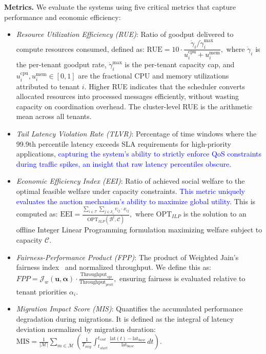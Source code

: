 \documentclass[lettersize,journal]{IEEEtran}
\begin{document}
\textbf{Metrics.} We evaluate the systems using five critical metrics that capture performance and economic efficiency:
\begin{itemize}[leftmargin=*,wide]
    \item \textit{Resource Utilization Efficiency (RUE)}: Ratio of goodput delivered to compute resources consumed, defined as:
    \(
    \text{RUE} = 10 \cdot \dfrac{\dot{\gamma}_i / \dot{\gamma}_i^{\max}}{u_i^{\text{cpu}} + u_i^{\text{mem}}},
    \)
    where $\dot{\gamma}_i$ is the per-tenant goodput rate, $\dot{\gamma}_i^{\max}$ is the per-tenant capacity cap, and $u_i^{\text{cpu}}, u_i^{\text{mem}} \in [0,1]$ are the fractional CPU and memory utilizations attributed to tenant $i$. Higher RUE indicates that the scheduler converts allocated resources into processed messages efficiently, without wasting capacity on coordination overhead. The cluster-level RUE is the arithmetic mean across all tenants.
    
    \item \textit{Tail Latency Violation Rate (TLVR)}: Percentage of time windows where the 99.9th percentile latency exceeds SLA requirements for high-priority applications, \textcolor{blue}{capturing the system's ability to strictly enforce QoS constraints during traffic spikes, an insight that raw latency percentiles obscure.}
    
    \item \textit{Economic Efficiency Index (EEI)}: Ratio of achieved social welfare to the optimal feasible welfare under capacity constraints. \textcolor{blue}{This metric uniquely evaluates the auction mechanism's ability to maximize global utility.} This is computed as:
    \(
    \text{EEI} = \frac{\sum_{i \in \mathcal{T}} \sum_{j \in \mathcal{S}_i} v_{ij} \cdot x_{ij}}{\text{OPT}_{ILP}(\mathcal{B}^t, \mathcal{C})},
    \)
    where $\text{OPT}_{ILP}$ is the solution to an offline Integer Linear Programming \cite{9973366} formulation maximizing welfare subject to capacity $\mathcal{C}$.
    
    \item \textit{Fairness-Performance Product (FPP)}: The product of Weighted Jain's fairness index~\cite{jain1998quantitativemeasurefairnessdiscrimination} and normalized throughput. We define this as:
    \(
    FPP = \mathcal{J}_w(\mathbf{u}, \mathbf{\alpha}) \cdot \frac{\text{Throughput}_{sys}}{\text{Throughput}_{peak}},
    \)
    ensuring fairness is evaluated relative to tenant priorities $\alpha_i$.
    
    \item \textit{Migration Impact Score (MIS)}: Quantifies the accumulated performance degradation during migrations. It is defined as the integral of latency deviation normalized by migration duration:
    \(
    \text{MIS} = \frac{1}{|\mathcal{M}|} \sum_{m \in \mathcal{M}} \left( \frac{1}{T_{mig}} \int_{t_{start}}^{t_{end}} \frac{\text{lat}(t) - \text{lat}_{base}}{\text{lat}_{base}} \, dt \right).
    \)
\end{itemize}
\end{document}
